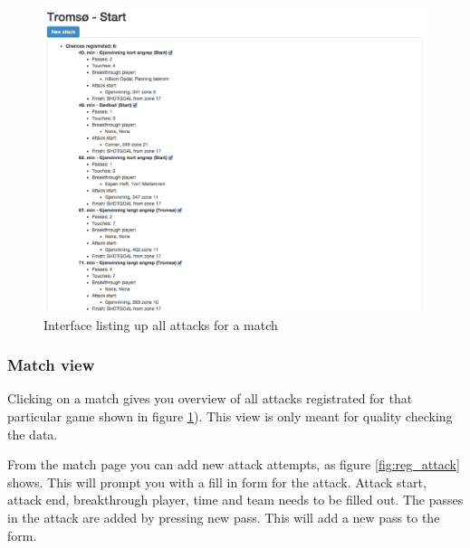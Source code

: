\begin{figure}[ht!]
\centering
\includegraphics[width=1\textwidth]{images/general/all_attacks.png}
\caption{Interface listing up all attacks for a match}
\label{fig:all_attacks}
\end{figure}

\subsubsection{Match view}

Clicking on a match gives you overview of all attacks registrated for that particular game shown in figure \ref{fig:all_attacks}). This view is only meant for quality checking the data.

From the match page you can add new attack attempts, as figure \ref{fig:reg_attack} shows. This will prompt you with a fill in form for the attack. Attack start, attack end, breakthrough player, time and team needs to be filled out. The passes in the attack are added by pressing new pass. This will add a new pass to the form.

